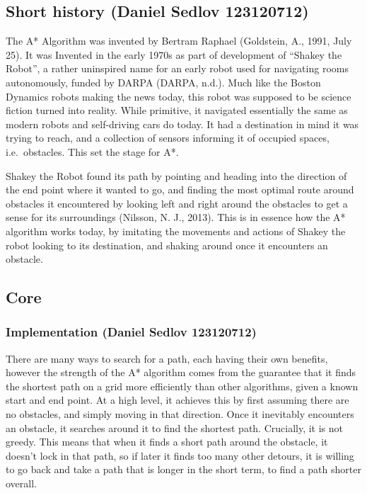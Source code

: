 \documentclass[11pt]{article}
\begin{document}
    \subsection{Short history (Daniel Sedlov
123120712)}\label{short-history-daniel-sedlov-123120712}

The A* Algorithm was invented by Bertram Raphael (Goldstein, A., 1991,
July 25). It was Invented in the early 1970s as part of development of
``Shakey the Robot'', a rather uninspired name for an early robot used
for navigating rooms autonomously, funded by DARPA (DARPA, n.d.). Much
like the Boston Dynamics robots making the news today, this robot was
supposed to be science fiction turned into reality. While primitive, it
navigated essentially the same as modern robots and self-driving cars do
today. It had a destination in mind it was trying to reach, and a
collection of sensors informing it of occupied spaces, i.e.~obstacles.
This set the stage for A*.

Shakey the Robot found its path by pointing and heading into the
direction of the end point where it wanted to go, and finding the most
optimal route around obstacles it encountered by looking left and right
around the obstacles to get a sense for its surroundings (Nilsson, N.
J., 2013). This is in essence how the A* algorithm works today, by
imitating the movements and actions of Shakey the robot looking to its
destination, and shaking around once it encounters an obstacle.

    \subsection{Core}\label{core}

\subsubsection{Implementation (Daniel Sedlov
123120712)}\label{implementation-daniel-sedlov-123120712}

There are many ways to search for a path, each having their own
benefits, however the strength of the A* algorithm comes from the
guarantee that it finds the shortest path on a grid more efficiently
than other algorithms, given a known start and end point. At a high
level, it achieves this by first assuming there are no obstacles, and
simply moving in that direction. Once it inevitably encounters an
obstacle, it searches around it to find the shortest path. Crucially, it
is not greedy. This means that when it finds a short path around the
obstacle, it doesn't lock in that path, so if later it finds too many
other detours, it is willing to go back and take a path that is longer
in the short term, to find a path shorter overall.
\end{document}
